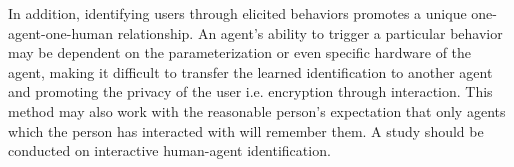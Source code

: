 \documentclass[conference]{IEEEtran}
\begin{document}
In addition, identifying users through elicited behaviors promotes a unique one-agent-one-human relationship. An agent's ability to trigger a particular behavior may be dependent on the parameterization or even specific hardware of the agent, making it difficult to transfer the learned identification to another agent and promoting the privacy of the user i.e. encryption through interaction. This method may also work with the reasonable person's expectation that only agents which the person has interacted with will remember them. A study should be conducted on interactive human-agent identification. 





\end{document}
